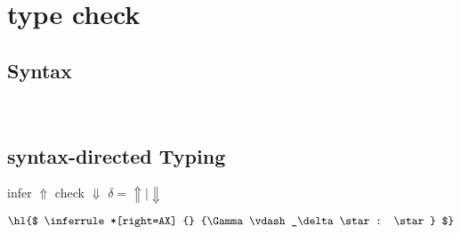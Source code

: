 \section{type check}

\subsection{Syntax}
\gram{
      \otte\ottinterrule
      \ottR\ottinterrule
      \ottt\ottinterrule
  }
\\[2.0mm]


\subsection{syntax-directed Typing}

\newcommand{\pgm}{\mathsf{P}}
\newcommand{\nat}{\mathsf{nat}}
\newcommand{\logic}{\mathsf{L}}
\newcommand{\judge}{\Gamma\vdash}

\newcommand{\checktype}{\Gamma\vdash_\Downarrow}
\newcommand{\infertype}{\Gamma\vdash_\Uparrow}
\newcommand{\infercheck}{\Gamma\vdash_\delta}

\newcommand{\checktypeno}{\vdash_\Downarrow}
\newcommand{\infertypeno}{\vdash_\Uparrow}
\newcommand{\infercheckno}{\vdash_\delta}

\newcommand{\instinfer}{\vdash^{inst}_\Uparrow}
\newcommand{\instcheck}{\vdash^{inst}_\Downarrow}
\newcommand{\instinfercheck}{\vdash^{inst}_\delta}

\newcommand{\polyinfer}{\vdash^{poly}_\Uparrow}
\newcommand{\polycheck}{\vdash^{poly}_\Downarrow}
\newcommand{\polyinfercheck}{\vdash^{poly}_\delta}

\newcommand{\polymorphic}{\vdash^{dsk}}
\newcommand{\polymorphicstar}{\vdash^{dsk\star}}

\newcommand{\substlet}{\textcolor{blue}{subst\_let}}

\newcommand{\forallvars}[1]{\forall \overbar{#1}}


\framebox{$ \judge e : \rho$ } infer $\Uparrow$ check $\Downarrow$ $\delta = \Uparrow \mid \Downarrow$

\[
\hl{$
\inferrule*[right=AX]
{} {\infercheck \star : \star}
$}
\]


